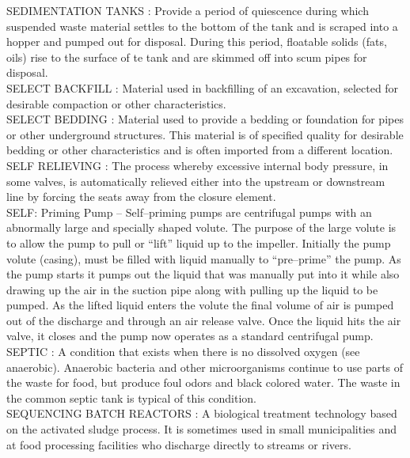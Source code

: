 SEDIMENTATION TANKS :   Provide a period of quiescence during which suspended waste material settles to the bottom of the tank and is scraped into a hopper and pumped out for disposal. During this period, floatable solids (fats, oils) rise to the surface of te tank and are skimmed off into scum pipes for disposal.\\
\vspace{0.15cm}
SELECT BACKFILL :  Material used in backfilling of an excavation, selected for desirable compaction or other characteristics. \\
\vspace{0.15cm}
SELECT BEDDING :  Material used to provide a bedding or foundation for pipes or other underground structures. This material is of specified quality for desirable bedding or other characteristics and is often imported from a different location. \\
\vspace{0.15cm}
SELF RELIEVING :   The process whereby excessive internal body pressure, in some valves, is automatically relieved either into the upstream or downstream line by forcing the seats away from the closure element.\\
\vspace{0.15cm}
SELF: Priming Pump –  Self–priming pumps are centrifugal pumps with an abnormally large and specially shaped volute. The purpose of the large volute is to allow the pump to pull or “lift” liquid up to the impeller. Initially the pump volute (casing), must be filled with liquid manually to “pre–prime” the pump. As the pump starts it pumps out the liquid that was manually put into it while also drawing up the air in the suction pipe along with pulling up the liquid to be pumped. As the lifted liquid enters the volute the final volume of air is pumped out of the discharge and through an air release valve. Once the liquid hits the air valve, it closes and the pump now operates as a standard centrifugal pump.\\
\vspace{0.15cm}
SEPTIC :  A condition that exists when there is no dissolved oxygen (see anaerobic). Anaerobic bacteria and other microorganisms continue to use parts of the waste for food, but produce foul odors and black colored water. The waste in the common septic tank is typical of this condition.\\
\vspace{0.15cm}
SEQUENCING BATCH REACTORS :   A biological treatment technology based on the activated sludge process. It is sometimes used in small municipalities and at food processing facilities who discharge directly to streams or rivers.\\
